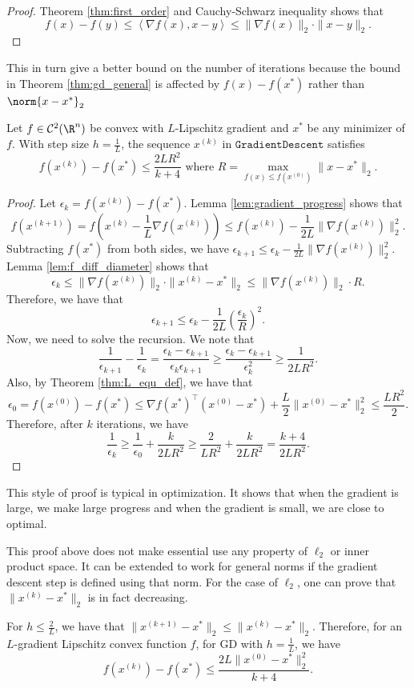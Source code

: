 \begin{proof}
Theorem \ref{thm:first_order} and Cauchy-Schwarz inequality shows
that 
\[
f(x)-f(y)\leq\left\langle \nabla f(x),x-y\right\rangle \leq\|\nabla f(x)\|_{2}\cdot\|x-y\|_{2}.
\]
\end{proof}
This in turn give a better bound on the number of iterations because
the bound in Theorem \ref{thm:gd_general} is affected by $f(x)-f(x^{*})$
rather than $\norm{x-x^{*}}_{2}$
\begin{thm}
\label{thm:gd_convex}Let $f\in\mathcal{C}^{2}(\R^{n})$ be convex
with $L$-Lipschitz gradient and $x^{*}$ be any minimizer of $f$.
With step size $h=\frac{1}{L}$, the sequence $x^{(k)}$ in $\mathtt{GradientDescent}$
satisfies
\[
f(x^{(k)})-f(x^{*})\leq\frac{2LR^{2}}{k+4}\text{ where }R=\max_{f(x)\leq f(x^{(0)})}\|x-x^{*}\|_{2}.
\]
\end{thm}

\begin{proof}
Let $\epsilon_{k}=f(x^{(k)})-f(x^{*})$. Lemma \ref{lem:gradient_progress}
shows that
\[
f(x^{(k+1)})=f(x^{(k)}-\frac{1}{L}\nabla f(x^{(k)}))\leq f(x^{(k)})-\frac{1}{2L}\|\nabla f(x^{(k)})\|_{2}^{2}.
\]
Subtracting $f(x^{*})$ from both sides, we have $\epsilon_{k+1}\leq\epsilon_{k}-\frac{1}{2L}\|\nabla f(x^{(k)})\|_{2}^{2}$.
Lemma \ref{lem:f_diff_diameter} shows that 
\[
\epsilon_{k}\leq\|\nabla f(x^{(k)})\|_{2}\cdot\|x^{(k)}-x^{*}\|_{2}\leq\|\nabla f(x^{(k)})\|_{2}\cdot R.
\]
Therefore, we have that
\[
\epsilon_{k+1}\leq\epsilon_{k}-\frac{1}{2L}\left(\frac{\epsilon_{k}}{R}\right)^{2}.
\]
Now, we need to solve the recursion. We note that
\[
\frac{1}{\epsilon_{k+1}}-\frac{1}{\epsilon_{k}}=\frac{\epsilon_{k}-\epsilon_{k+1}}{\epsilon_{k}\epsilon_{k+1}}\geq\frac{\epsilon_{k}-\epsilon_{k+1}}{\epsilon_{k}^{2}}\geq\frac{1}{2LR^{2}}.
\]
Also, by Theorem \ref{thm:L_equ_def}, we have that 
\[
\epsilon_{0}=f(x^{(0)})-f(x^{*})\leq\nabla f(x^{*})^{\top}(x^{(0)}-x^{*})+\frac{L}{2}\|x^{(0)}-x^{*}\|_{2}^{2}\leq\frac{LR^{2}}{2}.
\]
Therefore, after $k$ iterations, we have
\[
\frac{1}{\epsilon_{k}}\geq\frac{1}{\epsilon_{0}}+\frac{k}{2LR^{2}}\geq\frac{2}{LR^{2}}+\frac{k}{2LR^{2}}=\frac{k+4}{2LR^{2}}.
\]
\end{proof}
This style of proof is typical in optimization. It shows that when
the gradient is large, we make large progress and when the gradient
is small, we are close to optimal. 

This proof above does not make essential use any property of $\ell_{2}$
or inner product space. It can be extended to work for general norms
if the gradient descent step is defined using that norm. For the case
of $\ell_{2}$, one can prove that $\|x^{(k)}-x^{*}\|_{2}$ is in
fact decreasing. 
\begin{lem}
For $h\leq\frac{2}{L}$, we have that $\|x^{(k+1)}-x^{*}\|_{2}\leq\|x^{(k)}-x^{*}\|_{2}$.
Therefore, for an $L$-gradient Lipschitz convex function $f$, for
GD with $h=\frac{1}{L}$, we have
\[
f(x^{(k)})-f(x^{*})\leq\frac{2L\|x^{(0)}-x^{*}\|_{2}^{2}}{k+4}.
\]
\end{lem}

